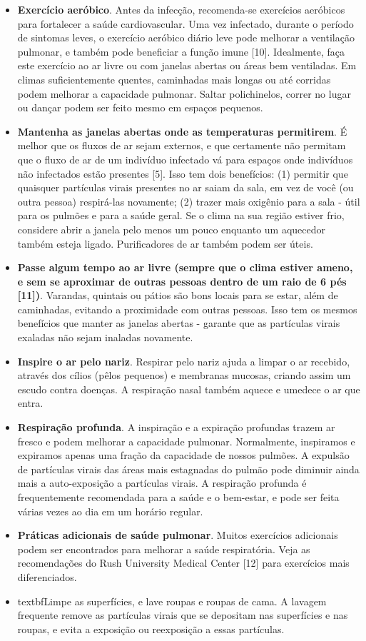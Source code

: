 \documentclass[onecolumn,journal]{IEEEtran}
\begin{document}
\begin{multicols}{2}
\begin{itemize}
\item \textbf{Exercício aeróbico}. Antes da infecção, recomenda-se exercícios aeróbicos para fortalecer a saúde cardiovascular. Uma vez infectado, durante o período de sintomas leves, o exercício aeróbico diário leve pode melhorar a ventilação pulmonar, e também pode beneficiar a função imune [10]. Idealmente, faça este exercício ao ar livre ou com janelas abertas ou áreas bem ventiladas. Em climas suficientemente quentes, caminhadas mais longas ou até corridas podem melhorar a capacidade pulmonar. Saltar polichinelos, correr no lugar ou dançar podem ser feito mesmo em espaços pequenos.
\item \textbf{Mantenha as janelas abertas onde as temperaturas permitirem}. É melhor que os fluxos de ar sejam externos, e que certamente não permitam que o fluxo de ar de um indivíduo infectado vá para espaços onde indivíduos não infectados estão presentes [5]. Isso tem dois benefícios: (1) permitir que quaisquer partículas virais presentes no ar saiam da sala, em vez de você (ou outra pessoa) respirá-las novamente; (2) trazer mais oxigênio para a sala - útil para os pulmões e para a saúde geral. Se o clima na sua região estiver frio, considere abrir a janela pelo menos um pouco enquanto um aquecedor também esteja ligado. Purificadores de ar também podem ser úteis.
\item \textbf{Passe algum tempo ao ar livre (sempre que o clima estiver ameno, e sem se aproximar de outras pessoas dentro de um raio de 6 pés [11])}. Varandas, quintais ou pátios são bons locais para se estar, além de caminhadas, evitando a proximidade com outras pessoas. Isso tem os mesmos benefícios que manter as janelas abertas - garante que as partículas virais exaladas não sejam inaladas novamente.
\item \textbf{Inspire o ar pelo nariz}. Respirar pelo nariz ajuda a limpar o ar recebido, através dos cílios (pêlos pequenos) e membranas mucosas, criando assim um escudo contra doenças. A respiração nasal também aquece e umedece o ar que entra.
\item \textbf{Respiração profunda}. A inspiração e a expiração profundas trazem ar fresco e podem melhorar a capacidade pulmonar. Normalmente, inspiramos e expiramos apenas uma fração da capacidade de nossos pulmões. A expulsão de partículas virais das áreas mais estagnadas do pulmão pode diminuir ainda mais a auto-exposição a partículas virais. A respiração profunda é frequentemente recomendada para a saúde e o bem-estar, e pode ser feita várias vezes ao dia em um horário regular.
\item \textbf{Práticas adicionais de saúde pulmonar}. Muitos exercícios adicionais podem ser encontrados para melhorar a saúde respiratória. Veja as recomendações do Rush University Medical Center [12] para exercícios mais diferenciados.
\item textbf{Limpe as superfícies, e lave roupas e roupas de cama}. A lavagem frequente remove as partículas virais que se depositam nas superfícies e nas roupas, e evita a exposição ou reexposição a essas partículas.
\end{itemize}


\end{multicols}
\end{document}
